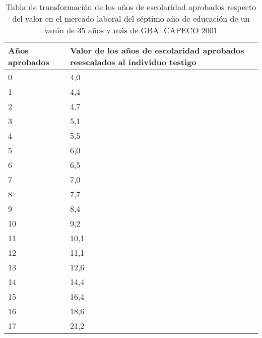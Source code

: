 \begin{table}[h!]
	\small
	\centering
	\caption{Tabla de transformación de los años de escolaridad aprobados respecto del valor en el mercado laboral del séptimo año de educación de un varón de 35 años y más de GBA. CAPECO 2001}
	\label{tab:tableVAE2001}
	\begin{tabular}{p{1cm}|p{3cm}}
		Años aprobados & Valor de los años de escolaridad aprobados
		reescalados al individuo testigo \\
		\hline
		0 & 4,0\\
		\hline
		1 & 4,4\\
		\hline
		2 & 4,7\\
		\hline
		3 & 5,1\\
		\hline
		4 & 5,5\\
		\hline
		5 & 6,0\\
		\hline
		6 & 6,5\\
		\hline
		7 & 7,0\\
		\hline
		8 & 7,7\\
		\hline
		9 & 8,4\\
		\hline
		10 & 9,2\\
		\hline
		11 & 10,1\\
		\hline
		12 & 11,1\\
		\hline
		13 & 12,6\\
		\hline
		14 & 14,4\\
		\hline
		15 & 16,4\\
		\hline
		16 & 18,6\\
		\hline
		17 & 21,2\\
		
	\end{tabular}
\end{table}


